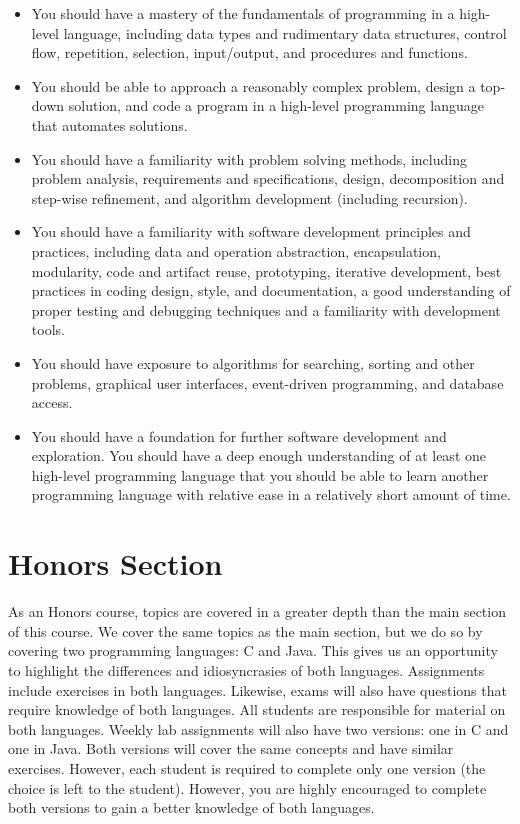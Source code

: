 \documentclass[12pt]{scrartcl}
\begin{document}
\begin{itemize}
  \item You should have a mastery of the fundamentals of programming 
  in a high-level language, including data types and rudimentary data 
  structures, control flow, repetition, selection, input/output, 
  and procedures and functions.
  \item You should be able to approach a reasonably complex problem, 
  design a top-down solution, and code a program in a high-level programming 
  language that automates solutions.
  \item You should have a familiarity with problem solving methods, 
  including problem analysis, requirements and specifications, design, 
  decomposition and step-wise refinement, and algorithm development 
  (including recursion).
  \item You should have a familiarity with software development principles 
  and practices, including data and operation abstraction, encapsulation, 
  modularity, code and artifact reuse, prototyping, iterative development, 
  best practices in coding design, style, and documentation, a good understanding
  of proper testing and debugging techniques and a familiarity with
  development tools.
  \item You should have exposure to algorithms for searching, sorting 
  and other problems, graphical user interfaces, event-driven programming, 
  and database access. 
  \item You should have a foundation for further software development and
  exploration.  You should have a deep enough understanding of at least
  one high-level programming language that you should be able to learn another
  programming language with relative ease in a relatively short amount of time.  
\end{itemize}

\section{Honors Section}

As an Honors course, topics are covered in a greater depth than the main
section of this course.  We cover the same topics as the main section, 
but we do so by covering two programming languages: C and Java.  This
gives us an opportunity to highlight the differences and idiosyncrasies 
of both languages.  Assignments include exercises in both languages.  
Likewise, exams will also have questions that require knowledge of both 
languages.  All students are responsible for material on both languages.
Weekly lab assignments will also have two versions: one in C and one in 
Java.  Both versions will cover the same concepts and have similar 
exercises.  However, each student is required to complete only one 
version (the choice is left to the student).  However, you are highly 
encouraged to complete both versions to gain a better knowledge of both 
languages.
\end{document}
